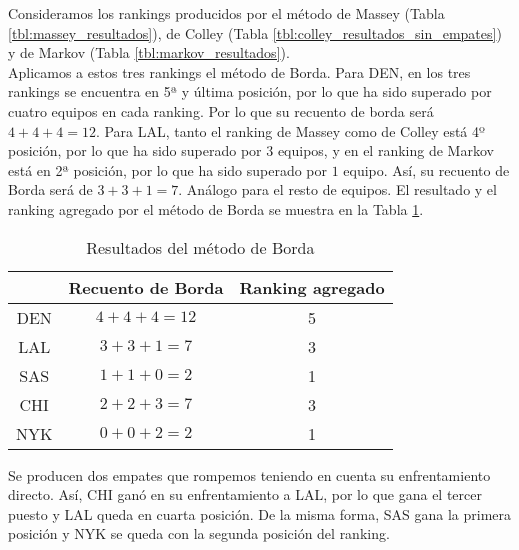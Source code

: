 \begin{ejemplo}\label{ej:borda}
Consideramos los rankings producidos por el método de Massey (Tabla \ref{tbl:massey_resultados}), de Colley (Tabla \ref{tbl:colley_resultados_sin_empates}) y de Markov (Tabla \ref{tbl:markov_resultados}).\\

Aplicamos a estos tres rankings el método de Borda. Para DEN, en los tres rankings se encuentra en 5ª y última posición, por lo que ha sido superado por cuatro equipos en cada ranking. Por lo que su recuento de borda será $4 + 4 + 4 = 12$. Para LAL, tanto el ranking de Massey como de Colley está 4º posición, por lo que ha sido superado por $3$ equipos, y en el ranking de Markov está en 2ª posición, por lo que ha sido superado por $1$ equipo. Así, su recuento de Borda será de $3 + 3 + 1 = 7$. Análogo para el resto de equipos. El resultado y el ranking agregado por el método de Borda se muestra en la Tabla \ref{tbl:borda_resultados}.

\begin{table}[h]
\centering
\caption{Resultados del método de Borda}
\label{tbl:borda_resultados}
\begin{tabular}{@{}ccc@{}}
\cmidrule(l){2-3}
    & Recuento de Borda & Ranking agregado \\ \midrule
DEN & $4 + 4 + 4 = 12$       & 5       \\
LAL & $3 + 3 + 1 =  7$       & 3       \\
SAS & $1 + 1 + 0 =  2$       & 1       \\
CHI & $2 + 2 + 3 =  7$       & 3       \\
NYK & $0 + 0 + 2 =  2$       & 1       \\ \bottomrule
\end{tabular}
\end{table}

Se producen dos empates que rompemos teniendo en cuenta su enfrentamiento directo. Así, CHI ganó en su enfrentamiento a LAL, por lo que gana el tercer puesto y LAL queda en cuarta posición. De la misma forma, SAS gana la primera posición y NYK se queda con la segunda posición del ranking. 

\end{ejemplo}


